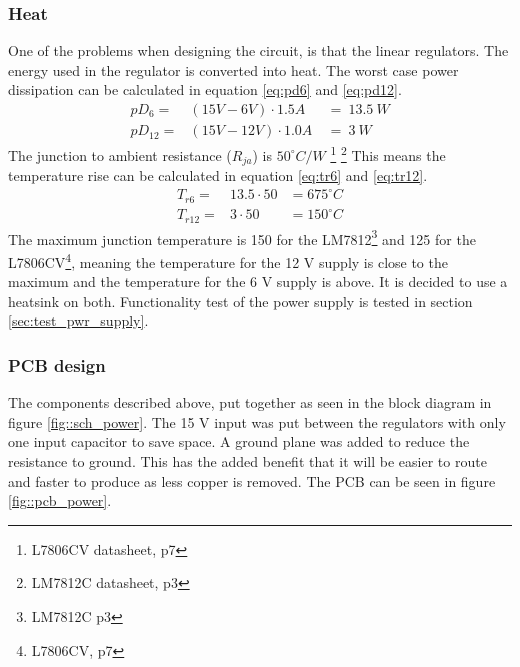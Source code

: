 \subsubsection{Heat}
One of the problems when designing the circuit, is that the linear regulators.
The energy used in the regulator is converted into heat.
The worst case power dissipation can be calculated in equation \ref{eq:pd6} and \ref{eq:pd12}.
\begin{eqnarray}
pD_{6}  =& (15V - 6V) \cdot 1.5A\ &=\ 13.5\ W \label{eq:pd6}\\
pD_{12} =& (15V - 12V)\cdot 1.0A\ &=\ 3\ W \label{eq:pd12}
\end{eqnarray}
The junction to ambient resistance ($R_{ja}$) is $50^\circ C/W$%
\footnote{L7806CV datasheet, p7}
\footnote{LM7812C datasheet, p3}
This means the temperature rise can be calculated in equation \ref{eq:tr6} and \ref{eq:tr12}.
\begin{eqnarray}
T_{r6}  =&  13.5 \cdot 50   &= 675^\circ C \label{eq:tr6}\\
T_{r12} =&  3 \cdot 50      &= 150^\circ C \label{eq:tr12}
\end{eqnarray}
The maximum junction temperature is 150 for the LM7812\footnote{LM7812C p3} and 125 for the L7806CV\footnote{L7806CV, p7}, meaning the temperature for the 12 V supply is close to the maximum and the temperature for the 6 V supply is above.
It is decided to use a heatsink on both.
Functionality test of the power supply is tested in section \ref{sec:test_pwr_supply}.

\subsubsection{PCB design}
The components described above, put together as seen in the block diagram in figure \ref{fig::sch_power}. 
The 15 V input was put between the regulators with only one input capacitor to save space.
A ground plane was added to reduce the resistance to ground.
This has the added benefit that it will be easier to route and faster to produce as less copper is removed.
The PCB can be seen in figure \ref{fig::pcb_power}.

